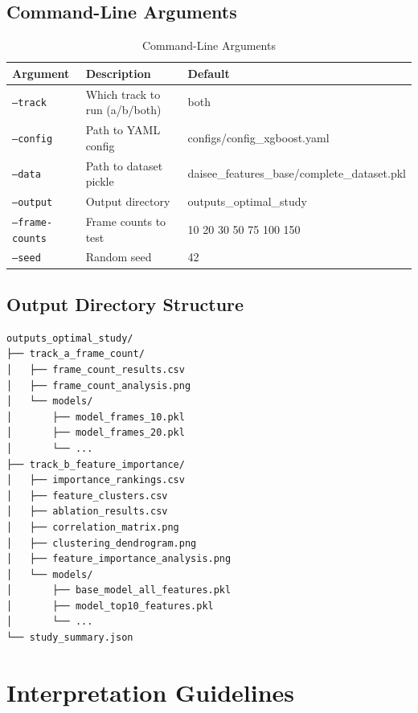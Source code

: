 \documentclass[11pt,a4paper]{article}
\begin{document}
\subsection{Command-Line Arguments}

\begin{table}[H]
\centering
\caption{Command-Line Arguments}
\label{tab:cli-args}
\begin{tabular}{@{}lll@{}}
\toprule
\textbf{Argument} & \textbf{Description} & \textbf{Default} \\
\midrule
\texttt{--track} & Which track to run (a/b/both) & both \\
\texttt{--config} & Path to YAML config & configs/config\_xgboost.yaml \\
\texttt{--data} & Path to dataset pickle & daisee\_features\_base/complete\_dataset.pkl \\
\texttt{--output} & Output directory & outputs\_optimal\_study \\
\texttt{--frame-counts} & Frame counts to test & 10 20 30 50 75 100 150 \\
\texttt{--seed} & Random seed & 42 \\
\bottomrule
\end{tabular}
\end{table}

\subsection{Output Directory Structure}

\begin{verbatim}
outputs_optimal_study/
├── track_a_frame_count/
│   ├── frame_count_results.csv
│   ├── frame_count_analysis.png
│   └── models/
│       ├── model_frames_10.pkl
│       ├── model_frames_20.pkl
│       └── ...
├── track_b_feature_importance/
│   ├── importance_rankings.csv
│   ├── feature_clusters.csv
│   ├── ablation_results.csv
│   ├── correlation_matrix.png
│   ├── clustering_dendrogram.png
│   ├── feature_importance_analysis.png
│   └── models/
│       ├── base_model_all_features.pkl
│       ├── model_top10_features.pkl
│       └── ...
└── study_summary.json
\end{verbatim}

\section{Interpretation Guidelines}\label{sec:interpretation}
\end{document}
